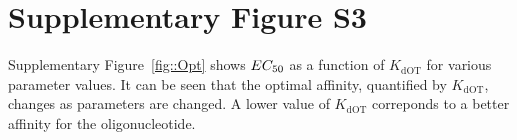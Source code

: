 \documentclass[a4paper,11pt]{article}
\newcommand{\EC}{EC_{\rm{50}}}
\newcommand{\KdOT}{K_{\mathrm{dOT}}}
\begin{document}
\section{Supplementary Figure S3}
Supplementary Figure~\ref{fig::Opt} shows $\EC$ as a function of $\KdOT$ for various parameter values. It can be seen that the optimal affinity, quantified by $\KdOT$, changes as parameters are changed. A lower value of $\KdOT$ correponds to a better affinity for the oligonucleotide.
%  
% 
%  
\end{document}
